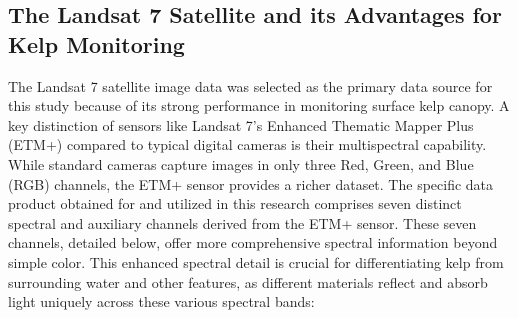 \documentclass{article}
\begin{document}
\subsection{The Landsat 7 Satellite and its Advantages for Kelp Monitoring} 

The Landsat 7 satellite image data was selected as the primary data source for this study because of its strong performance in monitoring surface kelp canopy. A key distinction of sensors like Landsat 7's Enhanced Thematic Mapper Plus (ETM+) compared to typical digital cameras is their multispectral capability. While standard cameras capture images in only three Red, Green, and Blue (RGB) channels, the ETM+ sensor provides a richer dataset. The specific data product obtained for and utilized in this research comprises seven distinct spectral and auxiliary channels derived from the ETM+ sensor. These seven channels, detailed below, offer more comprehensive spectral information beyond simple color. This enhanced spectral detail is crucial for differentiating kelp from surrounding water and other features, as different materials reflect and absorb light uniquely across these various spectral bands:
\end{document}
